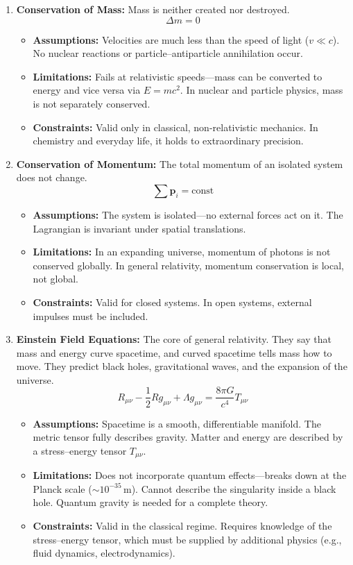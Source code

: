 \documentclass[11pt,openright]{book}
\begin{document}
\begin{enumerate}
\item \textbf{Conservation of Mass:} Mass is neither created nor destroyed.
\[
\Delta m=0
\]
\begin{itemize}
\item \textbf{Assumptions:} Velocities are much less than the speed of light ($v\ll c$). No nuclear reactions or particle--antiparticle annihilation occur.
\item \textbf{Limitations:} Fails at relativistic speeds---mass can be converted to energy and vice versa via $E=mc^2$. In nuclear and particle physics, mass is not separately conserved.
\item \textbf{Constraints:} Valid only in classical, non-relativistic mechanics. In chemistry and everyday life, it holds to extraordinary precision.
\end{itemize}

\item \textbf{Conservation of Momentum:} The total momentum of an isolated system does not change.
\[
\sum\mathbf p_i=\text{const}
\]
\begin{itemize}
\item \textbf{Assumptions:} The system is isolated---no external forces act on it. The Lagrangian is invariant under spatial translations.
\item \textbf{Limitations:} In an expanding universe, momentum of photons is not conserved globally. In general relativity, momentum conservation is local, not global.
\item \textbf{Constraints:} Valid for closed systems. In open systems, external impulses must be included.
\end{itemize}

\item \textbf{Einstein Field Equations:} The core of general relativity. They say that mass and energy curve spacetime, and curved spacetime tells mass how to move. They predict black holes, gravitational waves, and the expansion of the universe.
\[
R_{\mu\nu}-\frac12Rg_{\mu\nu}+\Lambda g_{\mu\nu}
=\frac{8\pi G}{c^4}T_{\mu\nu}
\]
\begin{itemize}
\item \textbf{Assumptions:} Spacetime is a smooth, differentiable manifold. The metric tensor fully describes gravity. Matter and energy are described by a stress--energy tensor $T_{\mu\nu}$.
\item \textbf{Limitations:} Does not incorporate quantum effects---breaks down at the Planck scale ($\sim10^{-35}$\,m). Cannot describe the singularity inside a black hole. Quantum gravity is needed for a complete theory.
\item \textbf{Constraints:} Valid in the classical regime. Requires knowledge of the stress--energy tensor, which must be supplied by additional physics (e.g., fluid dynamics, electrodynamics).
\end{itemize}


\end{enumerate}
\end{document}
